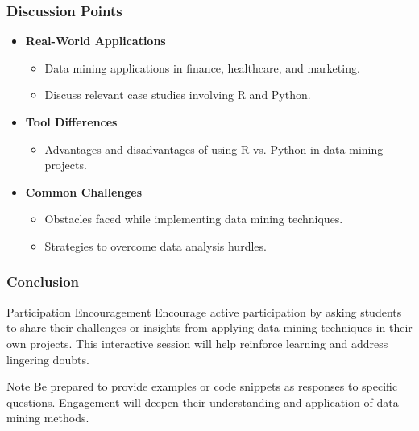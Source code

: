 \documentclass[aspectratio=169]{beamer}
\begin{document}
\begin{frame}[fragile]
    \frametitle{Discussion Points}
    \begin{itemize}
        \item \textbf{Real-World Applications}
        \begin{itemize}
            \item Data mining applications in finance, healthcare, and marketing.
            \item Discuss relevant case studies involving R and Python.
        \end{itemize}
        
        \item \textbf{Tool Differences}
        \begin{itemize}
            \item Advantages and disadvantages of using R vs. Python in data mining projects.
        \end{itemize}
        
        \item \textbf{Common Challenges}
        \begin{itemize}
            \item Obstacles faced while implementing data mining techniques.
            \item Strategies to overcome data analysis hurdles.
        \end{itemize}
    \end{itemize}
\end{frame}

\begin{frame}[fragile]
    \frametitle{Conclusion}
    \begin{block}{Participation Encouragement}
        Encourage active participation by asking students to share their challenges or insights from applying data mining techniques in their own projects. This interactive session will help reinforce learning and address lingering doubts.
    \end{block}
    
    \begin{block}{Note}
        Be prepared to provide examples or code snippets as responses to specific questions. Engagement will deepen their understanding and application of data mining methods.
    \end{block}
\end{frame}
\end{document}
